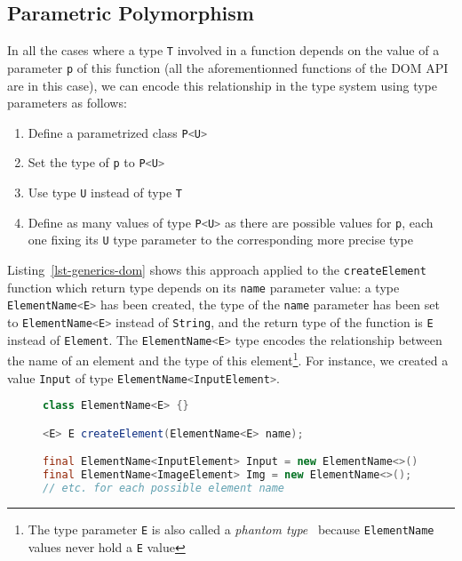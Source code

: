 \documentclass{llncs}
\newcommand{\jscode}[1]{\lstinline[language=JavaScript]|#1|}
\newcommand{\scalacode}[1]{\lstinline[language=Scala]|#1|}
\begin{document}
\subsection{Parametric Polymorphism}

In all the cases where a type \scalacode{T} involved in a function depends on the value of a parameter \scalacode{p} of this function (all the aforementionned functions of the DOM API are in this case), we can encode this relationship in the type system using type parameters as follows:

\begin{enumerate}
 \item Define a parametrized class \scalacode{P<U>}
 \item Set the type of \scalacode{p} to \scalacode{P<U>}
 \item Use type \scalacode{U} instead of type \scalacode{T}
 \item Define as many values of type \scalacode{P<U>} as there are possible values for \scalacode{p}, each one fixing its \scalacode{U} type parameter to the corresponding more precise type
\end{enumerate}

Listing~\ref{lst-generics-dom} shows this approach applied to the \jscode{createElement} function which return type depends on its \jscode{name} parameter value: a type \scalacode{ElementName<E>} has been created, the type of the \scalacode{name} parameter has been set to \scalacode{ElementName<E>} instead of \scalacode{String}, and the return type of the function is \scalacode{E} instead of \scalacode{Element}. The \scalacode{ElementName<E>} type encodes the relationship between the name of an element and the type of this element\footnote{The type parameter \scalacode{E} is also called a \emph{phantom type}~\cite{leijen1999domain} because \scalacode{ElementName} values never hold a \scalacode{E} value}. For instance, we created a value \scalacode{Input} of type \scalacode{ElementName<InputElement>}.

\begin{figure}
\begin{lstlisting}[label=lst-generics-dom,language=java,caption={Encoding of the \jscode{createElement} function using type parameters}]
class ElementName<E> {}

<E> E createElement(ElementName<E> name);

final ElementName<InputElement> Input = new ElementName<>();
final ElementName<ImageElement> Img = new ElementName<>();
// etc. for each possible element name
\end{lstlisting}
\end{figure}
\end{document}

